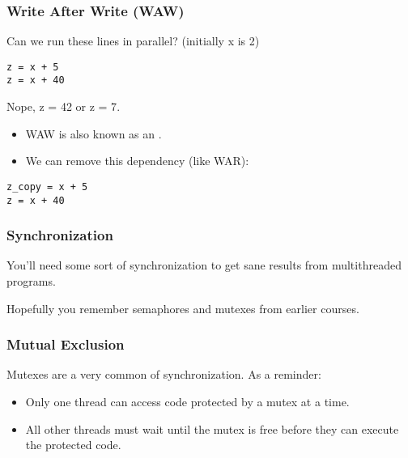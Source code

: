 \begin{frame}[fragile]
\frametitle{Write After Write (WAW)}

Can we run these lines in parallel? (initially x is 2)
\begin{lstlisting}
z = x + 5
z = x + 40
\end{lstlisting}
\pause
\alert{Nope, z = 42 or z = 7}.\\[1em]
\begin{itemize}
\item WAW is also known as an .
\item We can remove this dependency (like WAR):
\end{itemize}
\pause
\begin{lstlisting}
z_copy = x + 5
z = x + 40
\end{lstlisting}

\end{frame}


\begin{frame}
\frametitle{Synchronization}

You'll need some sort of synchronization to get sane results from
multithreaded programs. 

Hopefully you remember semaphores and mutexes from earlier courses.

\end{frame}


\begin{frame}
\frametitle{Mutual Exclusion}

Mutexes are a very common of synchronization.
As a reminder:
    \begin{itemize}
    \item Only one thread can access code protected by a mutex at a time.
    \item All other threads must wait until the mutex is free before they can
      execute the protected code.
    \end{itemize}


\end{frame}


